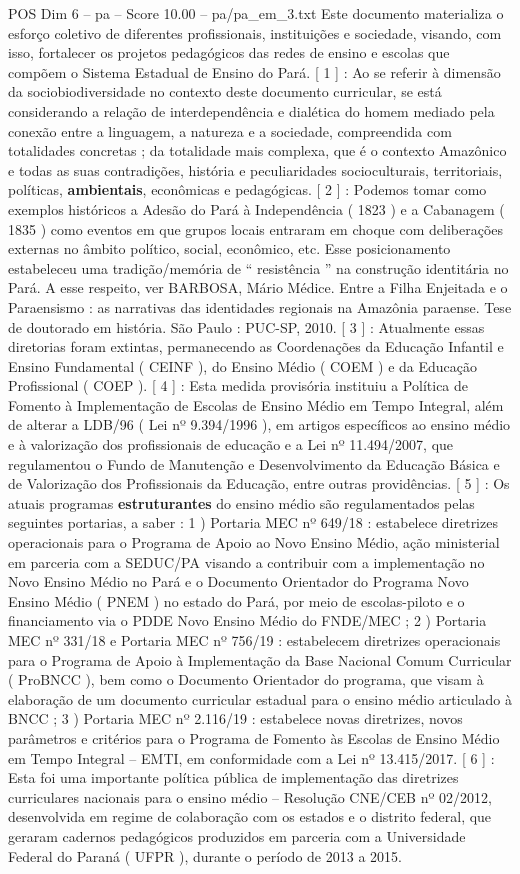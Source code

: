 \begin{textsample}{POS Dim 6 – pa – Score 10.00 – pa/pa\_em\_3.txt}
Este documento materializa o esforço coletivo de diferentes profissionais, instituições e sociedade, visando, com isso, fortalecer os projetos pedagógicos das redes de ensino e escolas que compõem o Sistema Estadual de Ensino do Pará. [ 1 ] : Ao se referir à dimensão da sociobiodiversidade no contexto deste documento curricular, se está considerando a relação de interdependência e dialética do homem mediado pela conexão entre a linguagem, a natureza e a sociedade, compreendida com totalidades concretas ; da totalidade mais complexa, que é o contexto Amazônico e todas as suas contradições, história e peculiaridades socioculturais, territoriais, políticas, \textbf{ambientais}, econômicas e pedagógicas. [ 2 ] : Podemos tomar como exemplos históricos a Adesão do Pará à Independência ( 1823 ) e a Cabanagem ( 1835 ) como eventos em que grupos locais entraram em choque com deliberações externas no âmbito político, social, econômico, etc.
Esse posicionamento estabeleceu uma tradição/memória de “ resistência ” na construção identitária no Pará.
A esse respeito, ver BARBOSA, Mário Médice.
Entre a Filha Enjeitada e o Paraensismo : as narrativas das identidades regionais na Amazônia paraense.
Tese de doutorado em história.
São Paulo : PUC-SP, 2010. [ 3 ] : Atualmente essas diretorias foram extintas, permanecendo as Coordenações da Educação Infantil e Ensino Fundamental ( CEINF ), do Ensino Médio ( COEM ) e da Educação Profissional ( COEP ). [ 4 ] : Esta medida provisória instituiu a Política de Fomento à Implementação de Escolas de Ensino Médio em Tempo Integral, além de alterar a LDB/96 ( Lei nº 9.394/1996 ), em artigos específicos ao ensino médio e à valorização dos profissionais de educação e a Lei nº 11.494/2007, que regulamentou o Fundo de Manutenção e Desenvolvimento da Educação Básica e de Valorização dos Profissionais da Educação, entre outras providências. [ 5 ] : Os atuais programas \textbf{estruturantes} do ensino médio são regulamentados pelas seguintes portarias, a saber : 1 ) Portaria MEC nº 649/18 : estabelece diretrizes operacionais para o Programa de Apoio ao Novo Ensino Médio, ação ministerial em parceria com a SEDUC/PA visando a contribuir com a implementação no Novo Ensino Médio no Pará e o Documento Orientador do Programa Novo Ensino Médio ( PNEM ) no estado do Pará, por meio de escolas-piloto e o financiamento via o PDDE Novo Ensino Médio do FNDE/MEC ; 2 ) Portaria MEC nº 331/18 e Portaria MEC nº 756/19 : estabelecem diretrizes operacionais para o Programa de Apoio à Implementação da Base Nacional Comum Curricular ( ProBNCC ), bem como o Documento Orientador do programa, que visam à elaboração de um documento curricular estadual para o ensino médio articulado à BNCC ; 3 ) Portaria MEC nº 2.116/19 : estabelece novas diretrizes, novos parâmetros e critérios para o Programa de Fomento às Escolas de Ensino Médio em Tempo Integral – EMTI, em conformidade com a Lei nº 13.415/2017. [ 6 ] : Esta foi uma importante política pública de implementação das diretrizes curriculares nacionais para o ensino médio – Resolução CNE/CEB nº 02/2012, desenvolvida em regime de colaboração com os estados e o distrito federal, que geraram cadernos pedagógicos produzidos em parceria com a Universidade Federal do Paraná ( UFPR ), durante o período de 2013 a 2015.

\end{textsample}
